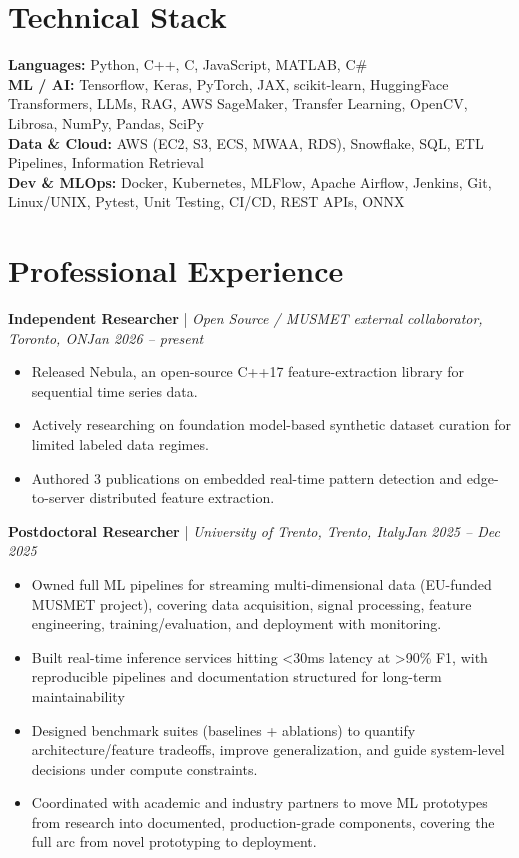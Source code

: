 \documentclass[11pt]{article}
\newenvironment{cvrole}[5]{%
  \par\noindent\textbf{\large #1} | \textit{\small #2, #3}\hfill \textit{\small #4 -- #5}\par
  \begin{itemize}[leftmargin=2em, itemsep=-0.3em, topsep=-0.5em]%
}{%
  \end{itemize}\par\noindent\mbox{}\par\vspace{0.1em}%
}
\begin{document}
\section*{Technical Stack}
\textbf{Languages:} Python, C++, C, JavaScript, MATLAB, C\#\\
\textbf{ML / AI:} Tensorflow, Keras, PyTorch, JAX, scikit-learn, HuggingFace Transformers, LLMs, RAG, AWS SageMaker, Transfer Learning, OpenCV, Librosa, NumPy, Pandas, SciPy\\
\textbf{Data \& Cloud:} AWS (EC2, S3, ECS, MWAA, RDS), Snowflake, SQL, ETL Pipelines, Information Retrieval\\
\textbf{Dev \& MLOps:} Docker, Kubernetes, MLFlow, Apache Airflow, Jenkins, Git, Linux/UNIX, Pytest, Unit Testing, CI/CD, REST APIs, ONNX

\section*{Professional Experience}
\begin{cvrole}{Independent Researcher}{Open Source / MUSMET external collaborator}{Toronto, ON}{Jan 2026}{present}
    \item Released Nebula, an open-source C++17 feature-extraction library for sequential time series data.
    \item Actively researching on foundation model-based synthetic dataset curation for limited labeled data regimes.
    \item Authored 3 publications on embedded real-time pattern detection and edge-to-server distributed feature extraction.
\end{cvrole}

\begin{cvrole}{Postdoctoral Researcher}{University of Trento}{Trento, Italy}{Jan 2025}{Dec 2025}
    \item Owned full ML pipelines for streaming multi-dimensional data (EU-funded MUSMET project), covering data acquisition, signal processing, feature engineering, training/evaluation, and deployment with monitoring.
    \item Built real-time inference services hitting <30ms latency at >90\% F1, with reproducible pipelines and documentation structured for long-term maintainability
    \item Designed benchmark suites (baselines + ablations) to quantify architecture/feature tradeoffs, improve generalization, and guide system-level decisions under compute constraints.
    \item Coordinated with academic and industry partners to move ML prototypes from research into documented, production-grade components, covering the full arc from novel prototyping to deployment.
\end{cvrole}
\end{document}
